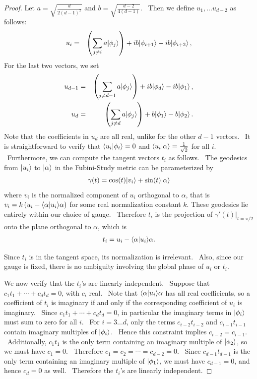 \documentclass[letterpaper,12pt]{article}
\newcommand{\ban}{\begin{eqnarray*}}
\newcommand{\ean}{\end{eqnarray*}}
\newcommand{\braket}[2]{\mbox{$ \langle #1 | #2 \rangle $}}
\newcommand{\ket}[1]{\mbox{$ | #1 \rangle $}}
\begin{document}
\begin{proof}
Let $a=\sqrt{\frac{d}{2(d-1)^2}}$ and $b=\sqrt{\frac{d-2}{4(d-1)}}$. \ Then we define $u_1,...u_{d-2}$ as follows:
\ban u_i &=& \left(\sum_{j \neq i}a\ket{\phi_j}\right) + ib\ket{\phi_{i+1}} - ib\ket{\phi_{i+2}}\,, \ean
For the last two vectors, we set
\ban u_{d-1} &=& \left(\sum_{j \neq d-1}a\ket{\phi_j}\right) + ib\ket{\phi_d} - ib\ket{\phi_1}\,, \\
 u_d &=& \left( \sum_{j \neq d} a \ket{\phi_j}\right) + b \ket{\phi_1} - b \ket{\phi_2}\,. \ean
Note that the coefficients in $u_d$ are all real, unlike for the other $d-1$ vectors. \ It is straightforward to verify that $\braket{u_i}{\phi_i} =0$ and $\braket{u_i}{\alpha}=\frac{1}{\sqrt{2}}$ for all $i$. \ Furthermore, we can compute the tangent vectors $t_i$ as follows. \ The geodesics from $\ket{u_i}$ to $\ket{\alpha}$ in the Fubini-Study metric can be parameterized by
\[\gamma(t) = \cos(t)\ket{v_i} + \sin(t)\ket{\alpha}\]
where $v_i$ is the normalized component of $u_i$ orthogonal to $\alpha$, that is $v_i=k\left( u_i - \braket{\alpha}{u_i} \alpha\right)$ for some real normalization constant $k$. These geodesics lie entirely within our choice of gauge. \ Therefore $t_i$ is the projection of $\gamma'(t)|_{t=\pi/2}$ onto the plane orthogonal to $\alpha$, which is
\ban t_i = u_i - \braket{\alpha}{u_i} \alpha. \ean

Since $t_i$ is in the tangent space, its normalization is irrelevant. \ Also, since our gauge is fixed, there is no ambiguity involving the global phase of $u_i$ or $t_i$.

We now verify that the $t_i$'s are linearly independent. \ Suppose that $c_1 t_1 + \cdots + c_d t_d = 0$, with $c_i$ real. \ Note that $\braket{\alpha}{u_i} \alpha$ has all real coefficients, so a coefficient of $t_i$ is imaginary if and only if the corresponding coefficient of $u_i$ is imaginary. \ Since $c_1 t_1 + \cdots + c_d t_d = 0$, in particular the imaginary terms in $\ket{\phi_i}$ must sum to zero for all $i$. \ For $i=3\ldots d$, only the terms $c_{i-2}t_{i-2}$ and $c_{i-1} t_{i-1}$ contain imaginary multiples of $\ket{\phi_i}$. \ Hence this constraint implies $c_{i-2}=c_{i-1}$. \ Additionally, $c_1t_1$ is the only term containing an imaginary multiple of $\ket{\phi_2}$, so we must have $c_1=0$. \ Therefore $c_1=c_2=\cdots=c_{d-2}=0$. \ Since $c_{d-1}t_{d-1}$ is the only term containing an imaginary multiple of $\ket{\phi_1}$, we must have $c_{d-1}=0$, and hence $c_d=0$ as well. \ Therefore the $t_i$'s are linearly independent.
\end{proof}
\end{document}
